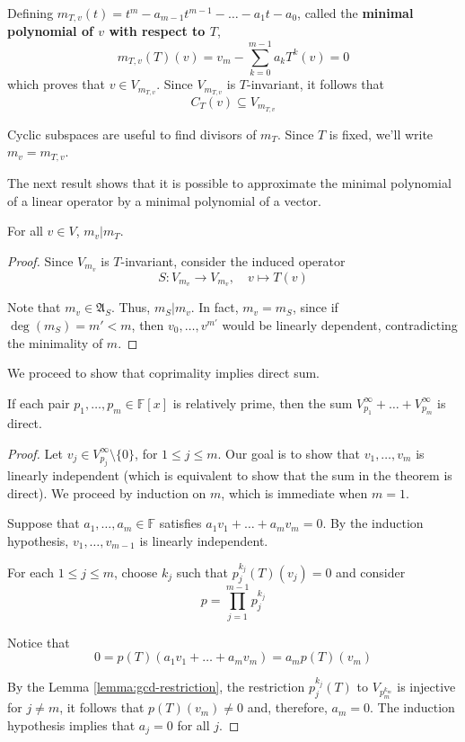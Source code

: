 Defining $m_{T,v}(t) = t^m - a_{m-1}t^{m-1} - \ldots - a_1t - a_0$, called the \textbf{minimal polynomial of $v$ with respect to $T$}, 
\[
	m_{T, v}(T)(v) = v_m - \sum_{k=0}^{m-1} a_k T^k(v) = 0
\]
which proves that $v \in V_{m_{T,v}}$. Since $V_{m_{T,v}}$ is $T$-invariant, it follows that
\[
	C_T(v) \subseteq V_{m_{T,v}}
\]

Cyclic subspaces are useful to find divisors of $m_T$. Since $T$ is fixed, we'll write $m_v = m_{T,v}$. 

The next result shows that it is possible to approximate the minimal polynomial of a linear operator by a minimal polynomial of a vector.

\begin{theorem}
	For all $v \in V$, $m_v | m_T$.
\end{theorem}

\begin{proof}
	Since $V_{m_v}$ is $T$-invariant, consider the induced operator
	\[
		S : V_{m_v} \longrightarrow V_{m_v}, \quad v \mapsto T(v)
	\]
	
	Note that $m_v \in \mathfrak{A}_S$. Thus, $m_S | m_v$. In fact, $m_v = m_S$, since if $\deg(m_S) = m' < m$, then $v_0, \ldots, v^{m'}$ would be linearly dependent, contradicting the minimality of $m$.
\end{proof}

We proceed to show that coprimality implies direct sum.

\begin{theorem}
	If each pair $p_1, \ldots, p_m \in \mathbb{F}[x]$ is relatively prime, then the sum $V_{p_1}^\infty + \ldots + V_{p_m}^\infty$ is direct.
\end{theorem}

\begin{proof}
	Let $v_j \in V_{p_j}^\infty \setminus \{ 0 \}$, for $1 \leq j \leq m$. Our goal is to show that $v_1, \ldots, v_m$ is linearly independent (which is equivalent to show that the sum in the theorem is direct). We proceed by induction on $m$, which is immediate when $m = 1$. 

	Suppose that $a_1, \ldots, a_m \in \mathbb{F}$ satisfies $a_1 v_1 + \ldots + a_m v_m = 0$. By the induction hypothesis, $v_1, \ldots, v_{m-1}$ is linearly independent. 

	For each $1 \leq j \leq m$, choose $k_j$ such that $p_j^{k_j}(T)(v_j) = 0$ and consider 
	\[
		p = \prod_{j=1}^{m-1} p_j^{k_j}
	\]

	Notice that 
	\[
		0 = p(T)(a_1 v_1 + \ldots + a_m v_m) = a_m p(T)(v_m)
	\]

	By the Lemma \ref{lemma:gcd-restriction}, the restriction $p_j^{k_j}(T)$ to $V_{p_m^{k_m}}$ is injective for $j \neq m$, it follows that $p(T)(v_m) \neq 0$ and, therefore, $a_m = 0$. The induction hypothesis implies that $a_j = 0$ for all $j$.
\end{proof}

